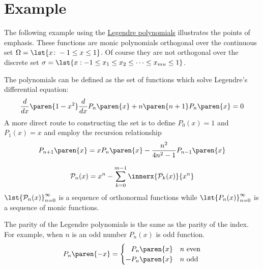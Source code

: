 \section{Example}

The following example using the \href{http://mathworld.wolfram.com/LegendrePolynomial.html}{Legendre polynomials} illustrates the points of emphasis. These functions are monic polynomials orthogonal over the continuous set $\Omega=\lst{x\colon -1 \le x \le 1}$. Of course they are not orthogonal over the discrete set $\sigma = \lst{x: -1 \le x_{1} \le x_{2} \le \cdots \le x_{mu} \le 1 }$.


The polynomials can be defined as the set of functions which solve Legendre's differential equation:
  \begin{equation}
    \frac{d}{dx} \paren{1-x^{2}} \frac{d}{dx} P_{n}\paren{x} + n\paren{n+1} P_{n}\paren{x} = 0
  \end{equation}
A more direct route to constructing the set is to define $P_{0}(x) = 1$ and $P_{1}(x) = x$ and employ the recursion relationship
  \begin{equation}
    P_{n+1}\paren{x} = x P_{n}\paren{x} - \frac{n^{2}} {4n^{2} - 1} P_{n-1}\paren{x}
  \end{equation}
  
  \begin{equation}
    \mathcal{P}_{n}(x) = x^{n} - \sum_{k=0}^{m-1} \innerx{\mathcal{P}_{k}(x)} {x^{n}}
  \end{equation}
$\lst{\mathcal{P}_{n}(x)}_{n=0}^{\infty}$ is a sequence of orthonormal functions while $\lst{P_{n}(x)}_{n=0}^{\infty}$ is a sequence of monic functions.

The parity of the Legendre polynomials is the same as the parity of the index. For example, when $n$ is an odd number $P_{n}(x)$ is odd function.
  \begin{equation}
      P_{n}\paren{-x} =
      \begin{cases}
        \phantom{-}P_{n}\paren{x} & n \text{ even} \\
        -P_{n}\paren{x} & n \text{ odd}
      \end{cases}
  \end{equation}

